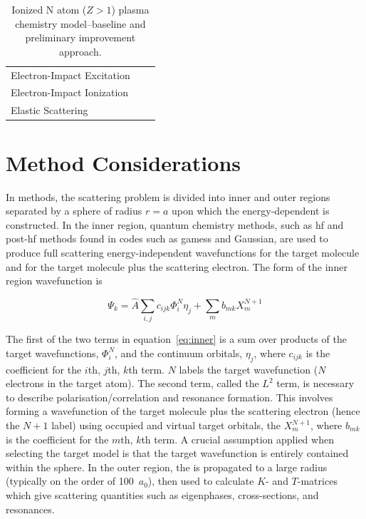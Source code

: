\documentclass[12pt]{article}
\begin{document}
\begin{table}
		\caption{Ionized N atom ($Z>1$) plasma chemistry model--baseline and preliminary improvement approach.}
		\centering
		\begin{tabular}{ p{5cm} p{8cm} p{8cm} }
				\hline\hline
				Electron-Impact Excitation &  & \\
				Electron-Impact Ionization & & \\
				Elastic Scattering & & \\
				\hline
		\end{tabular}
\end{table}

\clearpage 

\appendix

\section{\rmat{} Method Considerations}
In \rmat{} methods, 
the scattering problem is divided into inner
and outer regions separated by a
sphere of radius $r=a$ upon which the energy-dependent \rmat
is constructed. In the inner region, quantum chemistry
methods, such as \ac{hf} and post-\ac{hf} methods found in
codes such as \ac{gamess}\cite{gamess1993} and Gaussian\cite{g16}, 
are used to produce full scattering energy-independent
wavefunctions for the target molecule and for the target
molecule plus the scattering electron. The form of the inner
region wavefunction is

\begin{equation}
		\Psi_k = \hat{A}\sum_{i,j} c_{ijk} \Phi_i^N \eta_j + \sum_m b_{mk} X_m^{N+1} \label{eq:inner}
\end{equation}

The first of the two terms in equation~\ref{eq:inner} is a sum over
products of the target wavefunctions, $\Phi_i^N$, and
the continuum orbitals, $\eta_j$, where $c_{ijk}$ is the coefficient for the
$i$th, $j$th, $k$th term. $N$ labels the target wavefunction ($N$ electrons in the target atom).
The second term, called the $L^2$ term, is
necessary to describe polarisation/correlation and resonance
formation. This involves forming a wavefunction of the target
molecule plus the scattering electron (hence the $N+1$ label) using occupied and
virtual target orbitals, the $X_m^{N+1}$,
where $b_{mk}$ is the coefficient for the $m$th, $k$th term.
A crucial assumption applied when selecting the target
model is that the target wavefunction is entirely contained
within the \rmat{} sphere. In the outer region, the \rmat
is propagated to a large radius (typically on the order of 100~$a_0$), 
then used to calculate $K$- and $T$-matrices which give scattering quantities
such as eigenphases, cross-sections, and resonances.\\
\end{document}
